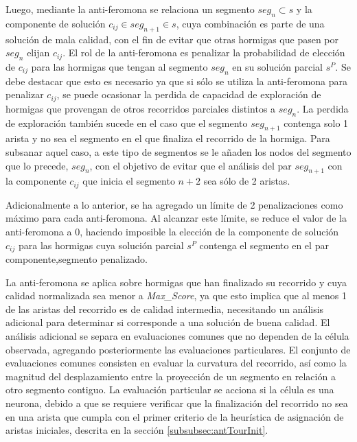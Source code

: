 Luego, mediante la anti-feromona se relaciona un segmento $seg_n \subset s$ y la componente de soluci\'on $c_{ij} \in seg_{n+1} \in s$, cuya combinaci\'on es parte de una soluci\'on de mala calidad, con el fin de evitar que otras hormigas que pasen por $seg_n$ elijan $c_{ij}$. El rol de la anti-feromona es penalizar la probabilidad de elecci\'on de $c_{ij}$ para las hormigas que tengan al segmento $seg_n$ en su soluci\'on parcial $s^{P}$. Se debe destacar que esto es necesario ya que si s\'olo se utiliza la anti-feromona para penalizar $c_{ij}$, se puede ocasionar la perdida de capacidad de exploraci\'on de hormigas que provengan de otros recorridos parciales distintos a $seg_n$. La perdida de exploraci\'on tambi\'en sucede en el caso que el segmento $seg_{n+1}$ contenga solo 1 arista y no sea el segmento en el que finaliza el recorrido de la hormiga. Para subsanar aquel caso, a este tipo de segmentos se le a\~naden los nodos del segmento que lo precede, $seg_{n}$, con el objetivo de evitar que el an\'alisis del par $seg_{n+1}$ con la componente $c_{ij}$ que inicia el segmento $n+2$ sea s\'olo de 2 aristas.


Adicionalmente a lo anterior, se ha agregado un l\'imite de 2 penalizaciones como m\'aximo para cada anti-feromona. Al alcanzar este l\'imite, se reduce el valor de la anti-feromona a 0, haciendo imposible la elecci\'on de la componente de soluci\'on $c_{ij}$ para las hormigas cuya soluci\'on parcial $s^{P}$ contenga el segmento en el par componente,segmento penalizado.


La anti-feromona se aplica sobre hormigas que han finalizado su recorrido y cuya calidad normalizada sea menor a {\it Max\_Score}, ya que esto implica que al menos 1 de las aristas del recorrido es de calidad intermedia, necesitando un an\'alisis adicional para determinar si corresponde a una soluci\'on de buena calidad. El an\'alisis adicional se separa en evaluaciones comunes que no dependen de la c\'elula observada, agregando posteriormente las evaluaciones particulares. El conjunto de evaluaciones comunes consisten en evaluar la curvatura del recorrido, as\'i como la magnitud del desplazamiento entre la proyecci\'on de un segmento en relaci\'on a otro segmento contiguo. La evaluaci\'on particular se acciona si la c\'elula es una neurona, debido a que se requiere verificar que la finalizaci\'on del recorrido no sea en una arista que cumpla con el primer criterio de la heur\'istica de asignaci\'on de aristas iniciales, descrita en la secci\'on \ref{subsubsec:antTourInit}.

